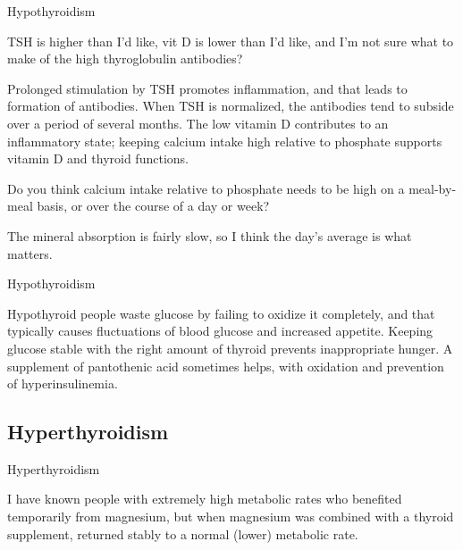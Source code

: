 \documentclass[11pt,oneside,openany,extrafontsizes]{memoir}
\begin{document}
\begin{emailexchange}{Hypothyroidism}

    \begin{question}
        TSH is higher than I'd like, vit D is lower than I'd like, and I'm not sure what to make of the high thyroglobulin antibodies?
    \end{question}

    \begin{answer}
      Prolonged stimulation by TSH promotes inflammation, and that leads to formation of antibodies. When TSH is normalized, the antibodies tend to subside over a period of several months. The low vitamin D contributes to an inflammatory state; keeping calcium intake high relative to phosphate supports vitamin D and thyroid functions.
    \end{answer}

    \begin{question}
        Do you think calcium intake relative to phosphate needs to be high on a meal-by-meal basis, or over the course of a day or week?
    \end{question}

    \begin{answer}
      The mineral absorption is fairly slow, so I think the day's average is what matters.
    \end{answer}
\end{emailexchange}

\begin{standalonequote}{Hypothyroidism}

    \begin{answer}
      Hypothyroid people waste glucose by failing to oxidize it completely, and that typically causes fluctuations of blood glucose and increased appetite. Keeping glucose stable with the right amount of thyroid prevents inappropriate hunger. A supplement of pantothenic acid sometimes helps, with oxidation and prevention of hyperinsulinemia.
    \end{answer}
\end{standalonequote}

\subsection{Hyperthyroidism}

\begin{standalonequote}{Hyperthyroidism}

    \begin{answer}
        I have known people with extremely high metabolic rates who benefited temporarily from magnesium, but when magnesium was combined with a thyroid supplement, returned stably to a normal (lower) metabolic rate.
    \end{answer}
\end{standalonequote}
\end{document}
